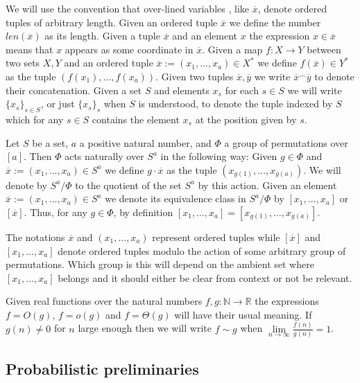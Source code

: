 \documentclass[12pt,notitlepage,a4paper]{article}
\theoremstyle{definition}
\newcommand{\R}{\mathbb{R}}
\newcommand{\N}{\mathbb{N}}
\newcommand{\Ln}{\lim\limits_{n\to \infty}}
\begin{document}
We will use the convention that over-lined variables
, like $\overline{x}$, denote ordered tuples of arbitrary length.
Given an ordered tuple $\overline{x}$
we define the number $len(\overline{x})$ as its length. 
Given a tuple $\overline{x}$ and an element $x$ the expression
$x\in \overline{x}$ means that $x$ appears as some coordinate
in $\overline{x}$. 
Given a map $f:X\rightarrow Y$ between two sets $X, Y$ and 
an ordered tuple $\overline{x}:=(x_1,\dots,x_a)\in X^*$ 
we define $f(\overline{x})\in Y^*$ as the tuple 
$(f(x_1),\dots,f(x_a))$.
Given two tuples $\overline{x},\overline{y}$
we write $\overline{x}^\smallfrown \overline{y}$ to denote their 
concatenation. Given a set $S$ and elements $x_s$ for each $s\in S$
we will write $\{x_s\}_{s\in S}$, or just $\{x_s\}_s$ when $S$ is understood,
to denote the tuple indexed by $S$ which for any $s\in S$
contains the element $x_s$ at the position given by $s$. 
\par



Let $S$ be a set, $a$ a positive natural number, 
and $\Phi$ a group of permutations over 
$[a]$. Then $\Phi$ acts naturally over
$S^a$ in the following way: Given $g\in \Phi$ and
$\overline{x}:=(x_1,\dots,x_a)\in S^a$ we define 
$g\cdot \overline{x}$ 
as the tuple $(x_{g(1)},\dots,x_{g(a)})$. 
We will denote by $S^a/\Phi$ to the quotient
of the set $S^a$ by this action. Given an element
$\overline{x}:=(x_1,\dots, x_a)\in S^a$ we denote its equivalence
class in $S^a/\Phi$ by $[x_1,\dots,x_a]$ or $[\overline{x}]$.
Thus, for any
$g\in \Phi$, by definition $[x_1,\dots,x_a]=[x_{g(1)}
,\dots,x_{g(a)}]$. \par
The notations $\overline{x}$ and
$(x_1,\dots, x_a)$ 
represent
ordered tuples while 
$[\overline{x}]$ and
$[x_1,\dots,x_a]$ denote ordered tuples modulo the
action of some arbitrary group of permutations. Which group is
this will depend on the ambient set where $[x_1,\dots,x_a]$ belongs
and it should either be clear from context or not be relevant.\par

Given real functions over the natural numbers 
$f,g:\N \rightarrow \R$ the expressions $f=O(g)$,
$f=o(g)$ and $f=\Theta(g)$ will have their usual meaning.
If $g(n)\neq 0$ for $n$ large enough then
we will write $f\sim g$ when $\Ln \frac{f(n)}{g(n)}=1$. \par


%
\subsection{Probabilistic preliminaries}
\end{document}
